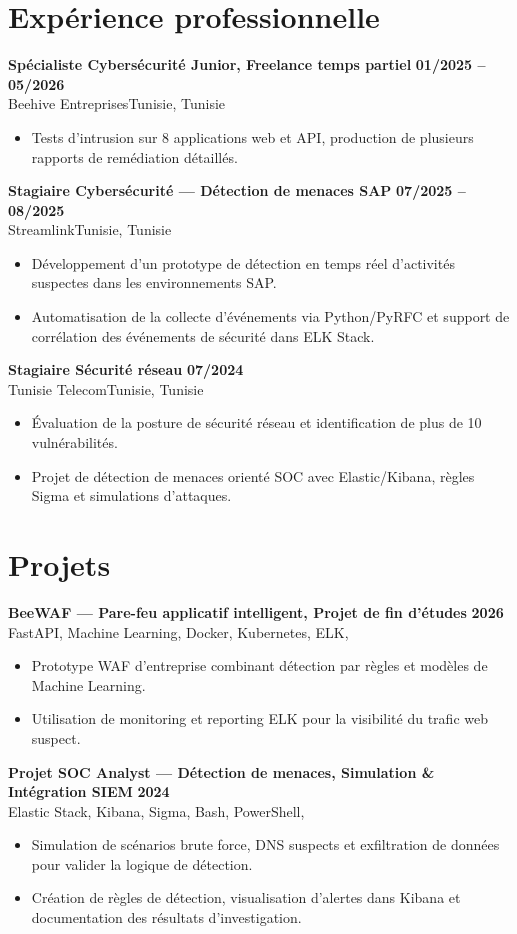 \documentclass[a4paper,10pt]{article}
\newcommand{\cventry}[4]{%
  \textbf{#1} \hfill \textbf{#4}\\[1pt]
  #2{\ifx\relax#3\relax\else, #3\fi}\par\vspace{2pt}}
\begin{document}
\section{Expérience professionnelle}
\cventry{Spécialiste Cybersécurité Junior, Freelance temps partiel}{Beehive Entreprises}{Tunisie}{01/2025 -- 05/2026}
\begin{itemize}
  \item Tests d'intrusion sur 8 applications web et API, production de plusieurs rapports de remédiation détaillés.
\end{itemize}
\cventry{Stagiaire Cybersécurité — Détection de menaces SAP}{Streamlink}{Tunisie}{07/2025 -- 08/2025}
\begin{itemize}
  \item Développement d'un prototype de détection en temps réel d'activités suspectes dans les environnements SAP.
  \item Automatisation de la collecte d'événements via Python/PyRFC et support de corrélation des événements de sécurité dans ELK Stack.
\end{itemize}
\cventry{Stagiaire Sécurité réseau}{Tunisie Telecom}{Tunisie}{07/2024}
\begin{itemize}
  \item Évaluation de la posture de sécurité réseau et identification de plus de 10 vulnérabilités.
  \item Projet de détection de menaces orienté SOC avec Elastic/Kibana, règles Sigma et simulations d'attaques.
\end{itemize}
\section{Projets}
\cventry{BeeWAF — Pare-feu applicatif intelligent, Projet de fin d'études}{FastAPI, Machine Learning, Docker, Kubernetes, ELK}{}{2026}
\begin{itemize}
  \item Prototype WAF d'entreprise combinant détection par règles et modèles de Machine Learning.
  \item Utilisation de monitoring et reporting ELK pour la visibilité du trafic web suspect.
\end{itemize}
\cventry{Projet SOC Analyst — Détection de menaces, Simulation \& Intégration SIEM}{Elastic Stack, Kibana, Sigma, Bash, PowerShell}{}{2024}
\begin{itemize}
  \item Simulation de scénarios brute force, DNS suspects et exfiltration de données pour valider la logique de détection.
  \item Création de règles de détection, visualisation d'alertes dans Kibana et documentation des résultats d'investigation.
\end{itemize}
\end{document}
